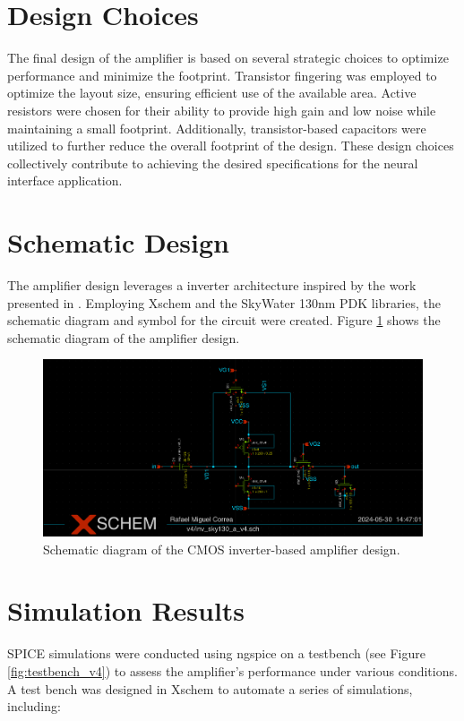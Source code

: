 \section{Design Choices}
The final design of the amplifier is based on several strategic choices to optimize performance and minimize the footprint. 
Transistor fingering was employed to optimize the layout size, ensuring efficient use of the available area. 
Active resistors were chosen for their ability to provide high gain and low noise while maintaining a small footprint. 
Additionally, transistor-based capacitors were utilized to further reduce the overall footprint of the design. 
These design choices collectively contribute to achieving the desired specifications for the neural interface application.

\section{Schematic Design}
The amplifier design leverages a inverter architecture inspired by the work presented in \textcite{Yuan_Hierlemann_Frey_2021}.
Employing Xschem and the SkyWater 130nm PDK libraries, the schematic diagram and symbol for the circuit were created. 
Figure \ref{fig:schematic_v4} shows the schematic diagram of the amplifier design.

\begin{figure}[ht!]
\centering
\includegraphics[width=\textwidth]{Figures/v4_schematic.png}
\caption{Schematic diagram of the CMOS inverter-based amplifier design.}
\label{fig:schematic_v4}
\end{figure}

\section{Simulation Results}

SPICE simulations were conducted using ngspice on a testbench (see Figure \ref{fig:testbench_v4}) to assess the amplifier's performance under various conditions. 
A test bench was designed in Xschem to automate a series of simulations, including:

